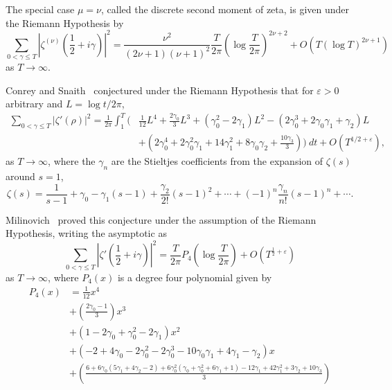 \documentclass[12pt, a4paper,reqno]{amsart}
\theoremstyle{definition}
\numberwithin{equation}{section}
\begin{document}
The special case $\mu=\nu$, called the discrete second moment of zeta, is given under the Riemann Hypothesis by
\begin{equation}\label{eq:gonek_muequalsnu}
    \sum_{0<\gamma\le T}\left|\zeta^{(\nu)}\left(\frac{1}{2}+i\gamma\right)\right|^2=\frac{\nu^2}{(2\nu+1)(\nu+1)^2}\frac{T}{2\pi}\left(\log \frac{T}{2\pi}
\right)^{2\nu+2}+O\left(T(\log T)^{2\nu+1}\right)
\end{equation}
as $T \rightarrow \infty$.

Conrey and Snaith~\cite{conrey2007applicationslfunctionsratiosconjectures} conjectured under the Riemann Hypothesis that for $\varepsilon > 0$ arbitrary and $L=\log t/2\pi$,
\begin{align*}
\sum_{0 < \gamma \leq T} |\zeta'(\rho)|^2 
= \frac{1}{2\pi}\int_1^T \Bigg(&
    \frac{1}{12} L^4
    + \frac{2\gamma_0}{3} L^3
    + \left( \gamma_0^2 - 2\gamma_1 \right) L^2 - \left( 2\gamma_0^3 + 2\gamma_0 \gamma_1 + \gamma_2 \right) L \\
    &+ \left( 2\gamma_0^4 + 2\gamma_0^2 \gamma_1 + 14\gamma_1^2 
    + 8\gamma_0 \gamma_2 + \frac{10\gamma_3}{3} \right)
\Bigg) \ dt + O\left(T^{1/2 + \varepsilon} \right),
\end{align*}
as $T \rightarrow \infty$, where the $\gamma_n$ are the Stieltjes coefficients from the expansion of $\zeta(s)$ around $s=1$,
\begin{equation*}
    \zeta(s)=\frac{1}{s-1}+\gamma_0-\gamma_1(s-1)+\frac{\gamma_2}{2!}(s-1)^2+\cdots+(-1)^n \frac{\gamma_n}{n!} (s-1)^n + \cdots.
\end{equation*}


Milinovich~\cite{micah} proved this conjecture under the assumption of the Riemann Hypothesis, writing the asymptotic as
    \begin{equation}\label{milinovich_theorem}
        \sum_{0<\gamma\le T}\left|\zeta'\left(\frac{1}{2}+i\gamma\right)\right|^2=\frac{T}{2\pi} P_4\left(\log\frac{T}{2\pi}\right)+O\left(T^{\frac{1}{2}+\varepsilon}\right)
    \end{equation}
as $T \rightarrow \infty$, where $P_4(x)$ is a degree four polynomial given by
    \begin{align*}
P_4(x)  &= \frac{1}{12} x^4 \\
      &+ \left( \frac{2\gamma_0 - 1}{3} \right) x^3 \\
      &+ \left( 1 - 2\gamma_0 + \gamma_0^2 - 2\gamma_1 \right) x^2 \\
      &+ \left( -2 + 4\gamma_0 - 2\gamma_0^2 - 2\gamma_0^3 - 10\gamma_0\gamma_1 + 4\gamma_1 - \gamma_2 \right) x \\
      &+ \left( \frac{6 + 6\gamma_0(5\gamma_1 + 4\gamma_2 - 2) + 6\gamma_0^2(\gamma_0 + \gamma_0^2 + 6\gamma_1 + 1) 
            - 12\gamma_1 + 42\gamma_1^2 + 3\gamma_2 + 10\gamma_3}{3} \right)
\end{align*}
\end{document}
